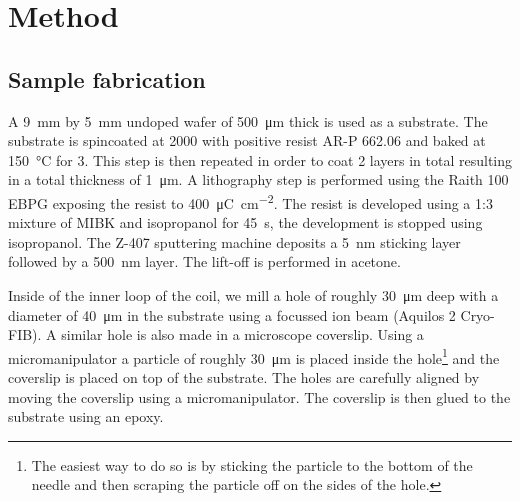 \chapter{Method}
\label{chap:method}

\section{Sample fabrication}
\label{sec:sample-fabrication}
A \qty{9}{\mm} by \qty{5}{\mm} undoped  wafer of \qty{500}{\um} thick is used as a substrate. The substrate is spincoated at \qty{2000}{\rpm} with positive resist AR-P 662.06 and baked at \qty{150}{\celsius} for \qty{3}{\min}. This step is then repeated in order to coat 2 layers in total resulting in a total thickness of \qty{1}{\um}. A lithography step is performed using the Raith 100 EBPG exposing the resist to \qty{400}{\micro\coulomb\per\square\cm}. The resist is developed using a 1:3 mixture of MIBK and isopropanol for \qty{45}{\s}, the development is stopped using isopropanol. The Z-407 sputtering machine deposits a \qty{5}{\nm}  sticking layer followed by a \qty{500}{\nm}  layer. The lift-off is performed in acetone.

Inside of the inner loop of the coil, we mill a hole of roughly \qty{30}{\um} deep with a diameter of \qty{40}{\um} in the  substrate using a  focussed ion beam (Aquilos 2 Cryo-FIB). A similar hole is also made in a microscope coverslip. Using a micromanipulator a  particle of roughly \qty{30}{\um} is placed inside the  hole\footnote{The easiest way to do so is by sticking the particle to the bottom of the needle and then scraping the particle off on the sides of the  hole.} and the coverslip is placed on top of the  substrate. The holes are carefully aligned by moving the coverslip using a micromanipulator. The coverslip is then glued to the  substrate using an epoxy.

